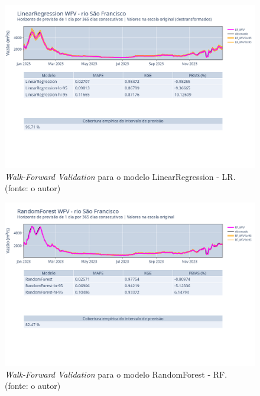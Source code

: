 \begin{figure}[!h]
	\centering
	\includegraphics[scale=0.33]{Figuras/rio_sao_francisco/wfv/LR/LR_WFV_LOG.png}
	\caption{\textit{Walk-Forward Validation} para o modelo LinearRegression - LR.\\(fonte: o autor)}
	\label{fig:francisco_LR_WFV_LOG}
\end{figure}

\begin{figure}[!h]
	\centering
	\includegraphics[scale=0.33]{Figuras/rio_sao_francisco/wfv/RF/RF_WFV_ORIG.png}
	\caption{\textit{Walk-Forward Validation} para o modelo RandomForest - RF.\\(fonte: o autor)}
	\label{fig:francisco_RF_WFV_ORIG}
\end{figure}
\clearpage


